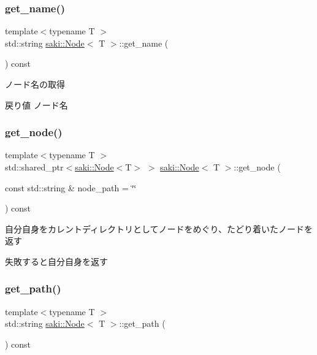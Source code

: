 \subsubsection{\texorpdfstring{get\+\_\+name()}{get\_name()}}
{\footnotesize\ttfamily template$<$typename T $>$ \\
std\+::string \mbox{\hyperlink{classsaki_1_1_node}{saki\+::\+Node}}$<$ T $>$\+::get\+\_\+name (\begin{DoxyParamCaption}{ }\end{DoxyParamCaption}) const\hspace{0.3cm}{\ttfamily [inline]}}



ノード名の取得 

\begin{DoxyReturn}{戻り値}
ノード名 
\end{DoxyReturn}
\mbox{\label{classsaki_1_1_node_a8faa1ffea41b2d9d0ceb337753fa1831}} 
\subsubsection{\texorpdfstring{get\+\_\+node()}{get\_node()}}
{\footnotesize\ttfamily template$<$typename T $>$ \\
std\+::shared\+\_\+ptr$<$\mbox{\hyperlink{classsaki_1_1_node}{saki\+::\+Node}}$<$T$>$ $>$ \mbox{\hyperlink{classsaki_1_1_node}{saki\+::\+Node}}$<$ T $>$\+::get\+\_\+node (\begin{DoxyParamCaption}\item[{const std\+::string \&}]{node\+\_\+path = {\ttfamily \char`\"{}\char`\"{}} }\end{DoxyParamCaption}) const\hspace{0.3cm}{\ttfamily [inline]}}



自分自身をカレントディレクトリとしてノードをめぐり、たどり着いたノードを返す 

失敗すると自分自身を返す \mbox{\label{classsaki_1_1_node_a5aa0d398aa417048879bc71d51ce2aa3}} 
\subsubsection{\texorpdfstring{get\+\_\+path()}{get\_path()}}
{\footnotesize\ttfamily template$<$typename T $>$ \\
std\+::string \mbox{\hyperlink{classsaki_1_1_node}{saki\+::\+Node}}$<$ T $>$\+::get\+\_\+path (\begin{DoxyParamCaption}{ }\end{DoxyParamCaption}) const\hspace{0.3cm}{\ttfamily [inline]}}



